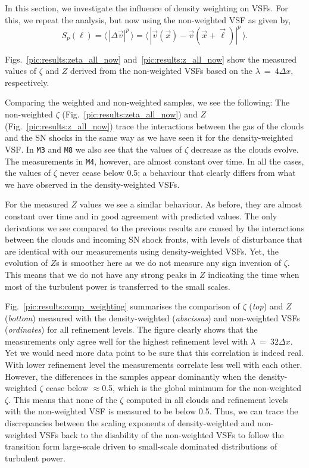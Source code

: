 In this section, we investigate the influence of density weighting on VSFs.
For this, we repeat the analysis, but now using the non-weighted VSF as given by,
\begin{equation}
	\mathit{S}_p (\ell) = \langle \, |\Delta \vec{v}|^p  \, \rangle = \langle \, |\vec{v}(\vec{x}) - \vec{v}(\vec{x} + \vec{\ell})|^p  \, \rangle .
    \label{equ:results:def_vsf_no}
\end{equation}

Figs.~\ref{pic:results:zeta_all_now} and~\ref{pic:results:z_all_now} show the measured values of $\zeta$ and $Z$ derived from the non-weighted VSFs based on the $\lambda~=~4\Delta x$, respectively.

Comparing the weighted and non-weighted samples, we see the following:
The non-weighted $\zeta$ (Fig.~\ref{pic:results:zeta_all_now}) and $Z$ (Fig.~\ref{pic:results:z_all_now}) trace the interactions between the gas of the clouds and the SN shocks in the same way as we have seen it for the density-weighted VSF.
In \texttt{M3} and \texttt{M8} we also see that the values of $\zeta$ decrease as the clouds evolve. 
The measurements in \texttt{M4}, however, are almost constant over time. 
In all the cases, the values of $\zeta$ never cease below 0.5; a behaviour that clearly differs from what we have observed in the density-weighted VSFs.

For the measured $Z$ values we see a similar behaviour. 
As before, they are almost constant over time and in good agreement with predicted values.
The only derivations we see compared to the previous results are caused by the interactions between the clouds and incoming SN shock fronts, with levels of disturbance that are identical with our measurements using density-weighted VSFs. 
Yet, the evolution of $Z$s is smoother here as we do not measure any sign inversion of $\zeta$.
This means that we do not have any strong peaks in $Z$ indicating the time when most of the turbulent power is transferred to the small scales. 

Fig.~\ref{pic:results:comp_weighting} summarises the comparison of $\zeta$ (\textit{top}) and $Z$ (\textit{bottom}) measured with the density-weighted (\textit{abscissas}) and non-weighted VSFs (\textit{ordinates}) for all refinement levels.
The figure clearly shows that the measurements only agree well for the highest refinement level with $\lambda~=~32\Delta x$.
Yet we would need more data point to be sure that this correlation is indeed real.
With lower refinement level the measurements correlate less well with each other. 
However, the differences in the samples appear dominantly when the density-weighted $\zeta$ cease below $\approx$0.5, which is the global minimum for the non-weighted $\zeta$. 
This means that none of the $\zeta$ computed in all clouds and refinement levels with the non-weighted VSF is measured to be below 0.5.
Thus, we can trace the discrepancies between the scaling exponents of density-weighted and non-weighted VSFs back to the disability of the non-weighted VSFs to follow the transition form large-scale driven to small-scale dominated distributions of turbulent power. 

